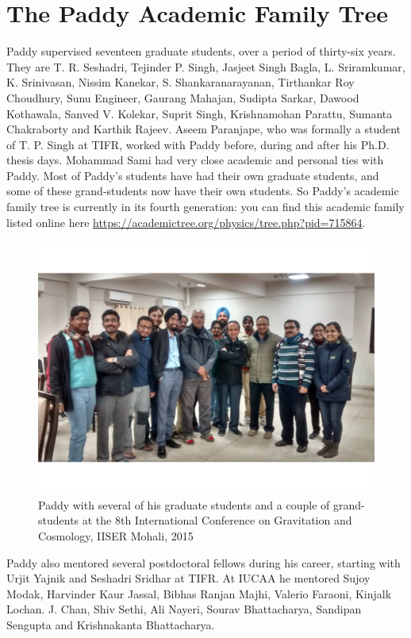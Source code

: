 \documentclass[prd, preprint, longbibliography, 11pt]{revtex4-1}
\begin{document}
\section{The Paddy Academic Family Tree}
\noindent Paddy supervised seventeen graduate students, over a period of thirty-six years. They are T. R. Seshadri, Tejinder P. Singh, Jasjeet Singh Bagla, L. Sriramkumar, K. Srinivasan, Nissim Kanekar, S. Shankaranarayanan, Tirthankar Roy Choudhury, Sunu Engineer, Gaurang Mahajan, Sudipta Sarkar, Dawood Kothawala, Sanved V. Kolekar, Suprit Singh, Krishnamohan Parattu, Sumanta Chakraborty and  Karthik Rajeev. Aseem Paranjape, who was formally a student of T. P. Singh at TIFR,  worked with Paddy before, during and after his Ph.D. thesis days. Mohammad Sami had very close academic and personal ties with Paddy. Most of Paddy's students have had their own graduate students, and some of these grand-students now have their own students. So Paddy's academic family tree is currently in its fourth generation: you can find this academic family listed online here \url{https://academictree.org/physics/tree.php?pid=715864}.
\begin{figure}[!h]
\centering
\includegraphics[width=12.00cm]{icgc19paddy.jpeg}
\caption*{Paddy with several of his graduate students and a couple of grand-students at the 8th International Conference on Gravitation and Cosmology, IISER Mohali, 2015} 
\end{figure}
Paddy also mentored several postdoctoral fellows during his career, starting with Urjit Yajnik and Seshadri Sridhar at TIFR. At IUCAA he mentored Sujoy Modak, Harvinder Kaur Jassal, Bibhas Ranjan Majhi, Valerio Faraoni, Kinjalk Lochan. J. Chan, Shiv Sethi, Ali Nayeri, Sourav Bhattacharya, Sandipan Sengupta and Krishnakanta Bhattacharya.
\end{document}
